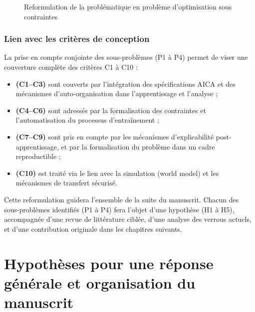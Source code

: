 \documentclass[ twoside,openright,titlepage,numbers=noenddot,headinclude,%
                footinclude=true,cleardoublepage=empty,abstractoff, %
                BCOR=5mm,paper=a4,fontsize=11pt,%
                french,american,%
                ]{scrreprt}
\begin{document}
\begin{figure}[H]
    \centering
    \caption{Reformulation de la problématique en problème d'optimisation sous contraintes}
    \label{fig:constrained_optimization_overview}
\end{figure}

\subsection{Lien avec les critères de conception}

La prise en compte conjointe des sous-problèmes (P1 à P4) permet de viser une couverture complète des critères C1 à C10 :

\begin{itemize}
    \item \textbf{(C1–C3)} sont couverts par l'intégration des spécifications AICA et des mécanismes d'auto-organisation dans l'apprentissage et l'analyse ;
    \item \textbf{(C4–C6)} sont adressés par la formalisation des contraintes et l'automatisation du processus d'entraînement ;
    \item \textbf{(C7–C9)} sont pris en compte par les mécanismes d'explicabilité post-apprentissage, et par la formalisation du problème dans un cadre reproductible ;
    \item \textbf{(C10)} est traité via le lien avec la simulation (world model) et les mécanismes de transfert sécurisé.
\end{itemize}

Cette reformulation guidera l'ensemble de la suite du manuscrit. Chacun des sous-problèmes identifiés (P1 à P4) fera l'objet d'une hypothèse (H1 à H5), accompagnée d'une revue de littérature ciblée, d'une analyse des verrous actuels, et d'une contribution originale dans les chapitres suivants.



\chapter{Hypothèses pour une réponse générale et organisation du manuscrit}
\end{document}
